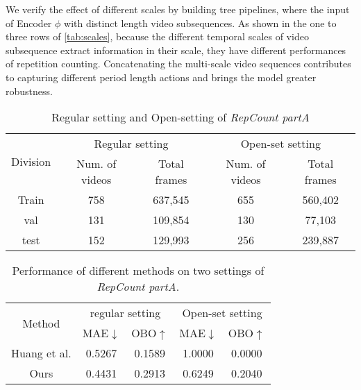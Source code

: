 \documentclass[10pt,twocolumn,letterpaper]{article}
\begin{document}
We verify the effect of different scales by building tree pipelines, where the input of Encoder $\phi$ with distinct length video subsequences. As shown in the one to three rows of \cref{tab:scales}, because the different temporal scales of video subsequence extract information in their scale, they have different performances of repetition counting. Concatenating the multi-scale video sequences contributes to capturing different period length actions and brings the model greater robustness.
\begin{table*}[htbp]
\centering
\begin{tabular}{c|cc|cc}
\hline
\multirow{2}{*}{Division}  & \multicolumn{2}{c|}{Regular setting}   & \multicolumn{2}{c}{Open-set setting}               \\ \cline{2-5} 
                        & \multicolumn{1}{c|}{Num. of videos} & Total frames & \multicolumn{1}{c|}{Num. of videos} & Total frames \\ \cline{1-5} 
Train                   & \multicolumn{1}{c|}{758}            & 637,545             & \multicolumn{1}{c|}{655}            &   560,402          \\
val                     & \multicolumn{1}{c|}{131}            & 109,854             & \multicolumn{1}{c|}{130}            &   77,103      \\
test                    & \multicolumn{1}{c|}{152}            & 129,993             & \multicolumn{1}{c|}{256}            &   239,887      \\ \hline
\end{tabular}
\caption{
Regular setting and Open-setting of \emph{RepCount partA}
}
\label{tab:openset}
\end{table*}

\begin{table*}[ht]
\centering
\begin{tabular}{c|cccc}
\hline
\multirow{2}{*}{Method}  & \multicolumn{2}{c|}{regular setting} & \multicolumn{2}{c}{Open-set setting} \\ \cline{2-5} 
                        & MAE$\downarrow$   & \multicolumn{1}{c|}{OBO$\uparrow$ }   & MAE$\downarrow$             & OBO$\uparrow$               \\ \hline
Huang et al. \cite{huang2020improving}   &  0.5267   & \multicolumn{1}{c|}{0.1589}    &    1.0000     &       0.0000           \\
Ours          & 0.4431  & \multicolumn{1}{c|}{0.2913}      &        0.6249 & 0.2040                  \\ \hline
\end{tabular}
\caption{
Performance of different methods on two settings of \emph{RepCount partA}.
}
\label{tab:reviewer3}
\end{table*}
\end{document}
